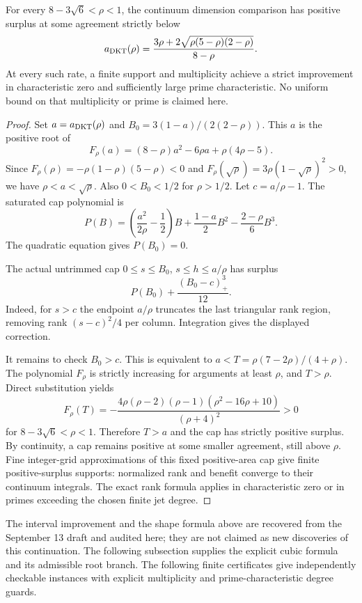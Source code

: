 \begin{corollary}
For every $8-3\sqrt6<\rho<1$, the continuum dimension comparison has
positive surplus at some agreement strictly below
\[
 a_{\rm DKT}(\rho)=
 \frac{3\rho+2\sqrt{\rho(5-\rho)(2-\rho)}}{8-\rho}.
\]
At every such rate, a finite support and multiplicity achieve a strict
improvement in characteristic zero and sufficiently large prime
characteristic. No uniform bound on that multiplicity or prime is claimed
here.
\end{corollary}
\begin{proof}
Set $a=a_{\rm DKT}(\rho)$ and $B_0=3(1-a)/(2(2-\rho))$.
This $a$ is the positive root of
\[
 F_\rho(a)=(8-\rho)a^2-6\rho a+\rho(4\rho-5).
\]
Since $F_\rho(\rho)=-\rho(1-\rho)(5-\rho)<0$ and
$F_\rho(\sqrt\rho)=3\rho(1-\sqrt\rho)^2>0$,
we have $\rho<a<\sqrt\rho$. Also $0<B_0<1/2$ for $\rho>1/2$.
Let $c=a/\rho-1$. The saturated cap polynomial is
\[
 P(B)=\left(\frac{a^2}{2\rho}-\frac12\right)B
       +\frac{1-a}{2}B^2-\frac{2-\rho}{6}B^3.
\]
The quadratic equation gives $P(B_0)=0$.

The actual untrimmed cap $0\le s\le B_0$, $s\le h\le a/\rho$
has surplus
\[
 P(B_0)+\frac{(B_0-c)_+^3}{12}.
\]
Indeed, for $s>c$ the endpoint $a/\rho$ truncates the last triangular
rank region, removing rank $(s-c)^2/4$ per column. Integration gives
the displayed correction.

It remains to check $B_0>c$. This is equivalent to
$a<T=\rho(7-2\rho)/(4+\rho)$. The polynomial $F_\rho$ is strictly
increasing for arguments at least $\rho$, and $T>\rho$. Direct
substitution yields
\[
 F_\rho(T)=
 -\frac{4\rho(\rho-2)(\rho-1)(\rho^2-16\rho+10)}{(\rho+4)^2}>0
\]
for $8-3\sqrt6<\rho<1$. Therefore $T>a$ and the cap has strictly
positive surplus. By continuity, a cap remains positive at some smaller
agreement, still above $\rho$. Fine integer-grid approximations of
this fixed positive-area cap give finite positive-surplus supports:
normalized rank and benefit converge to their continuum integrals.
The exact rank formula applies in characteristic zero or in primes
exceeding the chosen finite jet degree.
\end{proof}

The interval improvement and the shape formula above are recovered
from the September 13 draft and audited here; they are not claimed as
new discoveries of this continuation. The following subsection supplies the explicit cubic formula and its
admissible root branch. The following finite
certificates give independently checkable instances with explicit
multiplicity and prime-characteristic degree guards.


